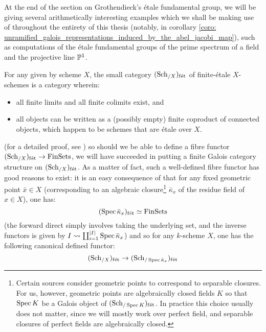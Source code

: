             At the end of the section on Grothendieck's \'etale fundamental group, we will be giving several arithmetically interesting examples which we shall be making use of throughout the entirety of this thesis (notably, in corollary \ref{coro: unramified_galois_representations_induced_by_the_abel_jacobi_map}), such as computations of the \'etale fundamental groups of the prime spectrum of a field and the projective line $\P^1$.
            \begin{remark} \label{remark: finite_etale_schemes}
                For any given by scheme $X$, the small category $(\Sch_{/X})_{\fet}$ of finite-\'etale $X$-schemes is a category wherein:
                    \begin{itemize}
                        \item all finite limits and all finite colimits exist, and
                        \item all objects can be written as a (possibly empty) finite coproduct of connected objects, which happen to be schemes that are \'etale over $X$.  
                    \end{itemize}
                (for a detailed proof, see \cite[\href{https://stacks.math.columbia.edu/tag/0BN9}{Tag 0BN9}]{stacks}) so should we be able to define a fibre functor $(\Sch_{/X})_{\fet} \to \Fin\Sets$, we will have succeeded in putting a finite Galois category structure on $(\Sch_{/X})_{\fet}$. As a matter of fact, such a well-defined fibre functor has good reasons to exist: it is an easy consequence of \cite[\href{https://stacks.math.columbia.edu/tag/00U3}{Tag 00U3}]{stacks} that for any fixed geometric point $\bar{x} \in X$ (corresponding to an algebraic closure\footnote{Certain sources consider geometric points to correspond to separable closures. For us, however, geometric points are algebraically closed fields $K$ so that $\Spec K$ be a Galois object of $(\Sch_{/\Spec K})_{\fet}$. In practice this choice usually does not matter, since we will mostly work over perfect field, and separable closures of perfect fields are algebraically closed.} $\bar{\kappa}_x$ of the residue field of $x \in X$), one has:
                    $$(\Spec \bar{\kappa}_x)_{\fet} \cong \Fin\Sets$$
                (the forward direct simply involves taking the underlying set, and the inverse functors is given by $I \mapsto \coprod_{i = 1}^{|I|} \Spec \bar{\kappa}_x$) and so for any $k$-scheme $X$, one has the following canonical defined functor:
                    $$(\Sch_{/X})_{\fet} \to (\Sch_{/\Spec \bar{\kappa}_x})_{\fet}$$

\end{remark}
